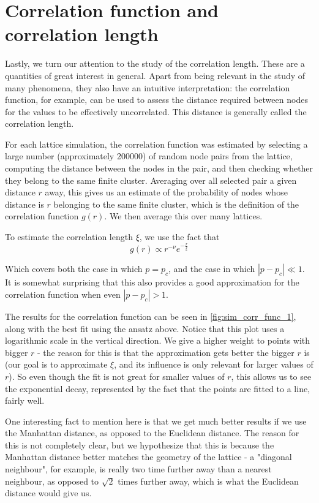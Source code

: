 \section{Correlation function and correlation length}


Lastly, we turn our attention to the study of the correlation length. These are a quantities of great interest in general. Apart from being relevant in the study of many phenomena, they also have an intuitive interpretation: the correlation function, for example, can be used to assess the distance required between nodes for the values to be effectively uncorrelated. This distance is generally called the correlation length.

For each lattice simulation, the correlation function was estimated by  selecting a large number (approximately 200000) of random node pairs from the lattice, computing the distance between the nodes in the pair, and then checking whether they belong to the same finite cluster. Averaging over all selected pair a given distance $r$ away, this gives us an estimate of the probability of nodes whose distance is $r$ belonging to the same finite cluster, which is the definition of the correlation function $g(r)$. We then average this over many lattices.

To estimate the correlation length $\xi$, we use the fact that
$$ 
 g(r) \propto r^{-\nu} e^{-\frac{r}{\xi}}
$$ 

Which covers both the case in which $p=p_c$, and the case in which $|p - p_c| \ll 1$. It is somewhat surprising that this also provides a good approximation for the correlation function when even $|p - p_c| > 1$.


The results for the correlation function can be seen in \autoref{fig:sim_corr_func_1}, along with the best fit using the ansatz above. Notice that this plot uses a logarithmic scale in the vertical direction. We give a higher weight to points with bigger $r$ - the reason for this is that the approximation gets better the bigger $r$ is (our goal is to approximate $\xi$, and its influence is only relevant for larger values of $r$). So even though the fit is not great for smaller values of $r$, this allows us to see the exponential decay, represented by the fact that the points are fitted to a line, fairly well.


One interesting fact to mention here is that we get much better results if we use the Manhattan distance, as opposed to the Euclidean distance. The reason for this is not completely clear, but we hypothesize that this is because the Manhattan distance better matches the geometry of the lattice - a "diagonal neighbour", for example, is really two time further away than a nearest neighbour, as opposed to $\sqrt{2}$ times further away, which is what the Euclidean distance would give us.

